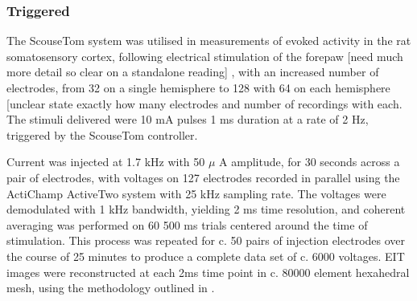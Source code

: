 \subsubsection{Triggered}

The ScouseTom system was utilised in measurements of evoked activity in the rat somatosensory cortex, following electrical stimulation of the forepaw [need much more detail so clear on a standalone reading] \cite{Aristovich_2016} \cite{Vongerichten_2016}, with an increased number of electrodes, from 32 on a single hemisphere to 128 with 64 on each hemisphere [unclear state exactly how many electrodes and number of recordings with each. The stimuli delivered were 10 mA pulses 1 ms duration at a rate of 2 Hz, triggered by the ScouseTom controller.

Current was injected at 1.7 kHz with 50 $\mu$ A amplitude, for 30 seconds across a pair of electrodes, with voltages on 127 electrodes recorded in parallel using the ActiChamp ActiveTwo system with 25 kHz sampling rate. The voltages were demodulated with 1 kHz bandwidth, yielding 2 ms time resolution, and coherent averaging was performed on 60 500 ms trials centered around the time of stimulation. This process was repeated for c. 50 pairs of injection electrodes over the course of 25 minutes to produce a complete data set of c. 6000 voltages. EIT images were reconstructed at each 2ms time point in c. 80000 element hexahedral mesh, using the methodology outlined in \cite{Aristovich_2014}.




